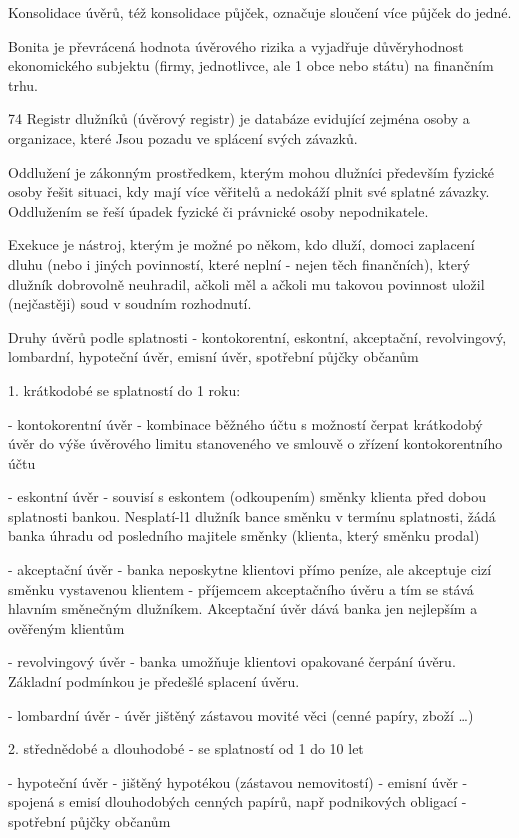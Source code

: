Konsolidace úvěrů, též konsolidace půjček, označuje sloučení více půjček do jedné.

Bonita je převrácená hodnota úvěrového rizika a vyjadřuje důvěryhodnost ekonomického
subjektu (firmy, jednotlivce, ale 1 obce nebo státu) na finančním trhu.

74
\newpage
Registr dlužníků (úvěrový registr) je databáze evidující zejména osoby a organizace, které
Jsou pozadu ve splácení svých závazků.

Oddlužení je zákonným prostředkem, kterým mohou dlužníci především fyzické osoby řešit
situaci, kdy mají více věřitelů a nedokáží plnit své splatné závazky. Oddlužením se řeší
úpadek fyzické či právnické osoby nepodnikatele.

Exekuce je nástroj, kterým je možné po někom, kdo dluží, domoci zaplacení dluhu (nebo i
jiných povinností, které neplní - nejen těch finančních), který dlužník dobrovolně neuhradil,
ačkoli měl a ačkoli mu takovou povinnost uložil (nejčastěji) soud v soudním rozhodnutí.

Druhy úvěrů podle splatnosti - kontokorentní, eskontní, akceptační, revolvingový,
lombardní, hypoteční úvěr, emisní úvěr, spotřební půjčky občanům

1. krátkodobé se splatností do 1 roku:

- kontokorentní úvěr - kombinace běžného účtu s možností čerpat krátkodobý úvěr do výše
úvěrového limitu stanoveného ve smlouvě o zřízení kontokorentního účtu

- eskontní úvěr - souvisí s eskontem (odkoupením) směnky klienta před dobou splatnosti
bankou. Nesplatí-l1 dlužník bance směnku v termínu splatnosti, žádá banka úhradu od
posledního majitele směnky (klienta, který směnku prodal)

- akceptační úvěr - banka neposkytne klientovi přímo peníze, ale akceptuje cizí směnku
vystavenou klientem - příjemcem akceptačního úvěru a tím se stává hlavním směnečným
dlužníkem. Akceptační úvěr dává banka jen nejlepším a ověřeným klientům

- revolvingový úvěr - banka umožňuje klientovi opakované čerpání úvěru. Základní
podmínkou je předešlé splacení úvěru.

- lombardní úvěr - úvěr jištěný zástavou movité věci (cenné papíry, zboží \ldots)

2. střednědobé a dlouhodobé - se splatností od 1 do 10 let

- hypoteční úvěr - jištěný hypotékou (zástavou nemovitostí)
- emisní úvěr - spojená s emisí dlouhodobých cenných papírů, např podnikových obligací
- spotřební půjčky občanům

